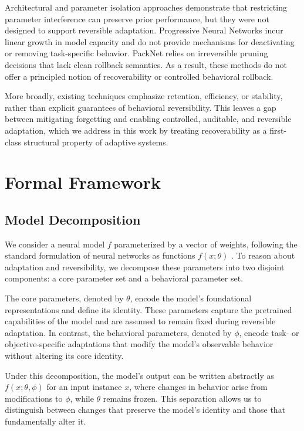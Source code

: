 \documentclass[10pt]{article}
\begin{document}
	Architectural and parameter isolation approaches demonstrate that restricting parameter interference can preserve prior performance, but they were not designed to support reversible adaptation. Progressive Neural Networks \cite{rusu2016progressive} incur linear growth in model capacity and do not provide mechanisms for deactivating or removing task-specific behavior. PackNet \cite{mallya2018packnet} relies on irreversible pruning decisions that lack clean rollback semantics. As a result, these methods do not offer a principled notion of recoverability or controlled behavioral rollback.
	
	More broadly, existing techniques emphasize retention, efficiency, or stability, rather than explicit guarantees of behavioral reversibility. This leaves a gap between mitigating forgetting and enabling controlled, auditable, and reversible adaptation, which we address in this work by treating recoverability as a first-class structural property of adaptive systems.
	
	\section{Formal Framework}
	\label{sec:formalmath}
	
	\subsection{Model Decomposition}
	\label{sec:model_decomposition}
	
	We consider a neural model $f$ parameterized by a vector of weights, following the standard formulation of neural networks as functions $f(x;\theta)$ \cite{Goodfellow-et-al-2016}. To reason about adaptation and reversibility, we decompose these parameters into two disjoint components: a core parameter set and a behavioral parameter set.
	
	The core parameters, denoted by $\theta$, encode the model’s foundational representations and define its identity. These parameters capture the pretrained capabilities of the model and are assumed to remain fixed during reversible adaptation. In contrast, the behavioral parameters, denoted by $\phi$, encode task- or objective-specific adaptations that modify the model’s observable behavior without altering its core identity.
	
	Under this decomposition, the model’s output can be written abstractly as $f(x;\theta,\phi)$ for an input instance $x$, where changes in behavior arise from modifications to $\phi$, while $\theta$ remains frozen. This separation allows us to distinguish between changes that preserve the model’s identity and those that fundamentally alter it.
	
\end{document}
